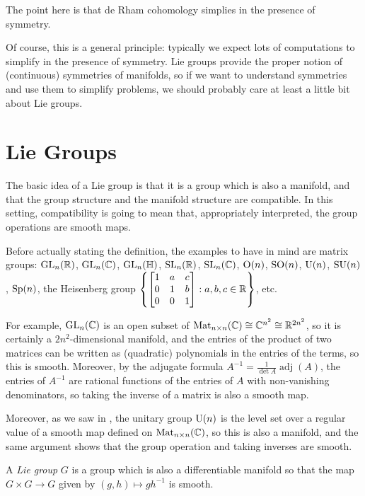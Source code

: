 The point here is that de Rham cohomology simplies in the presence of symmetry. 

Of course, this is a general principle: typically we expect lots of computations to simplify in the presence of symmetry. Lie groups provide the proper notion of (continuous) symmetries of manifolds, so if we want to understand symmetries and use them to simplify problems, we should probably care at least a little bit about Lie groups.

\section{Lie Groups} 
\label{sec:Lie groups}

The basic idea of a Lie group is that it is a group which is also a manifold, and that the group structure and the manifold structure are compatible. In this setting, compatibility is going to mean that, appropriately interpreted, the group operations are smooth maps.

Before actually stating the definition, the examples to have in mind are matrix groups: $\operatorname{GL}_n(\mathbb{R})$, $\operatorname{GL}_n(\mathbb{C})$, $\operatorname{GL}_n(\mathbb{H})$, $\operatorname{SL}_n(\mathbb{R})$, $\operatorname{SL}_n(\mathbb{C})$, $\operatorname{O}(n)$, $\operatorname{SO}(n)$, $\operatorname{U}(n)$, $\operatorname{SU}(n)$, $\operatorname{Sp}(n)$, the Heisenberg group $\left\{\begin{bmatrix} 1 & a & c \\ 0 & 1 & b \\ 0 & 0 & 1 \end{bmatrix} : a,b,c \in \mathbb{R}\right\}$, etc.

For example, $\operatorname{GL}_n(\mathbb{C})$ is an open subset of $\operatorname{Mat}_{n \times n}(\mathbb{C}) \cong \mathbb{C}^{n^2} \cong \mathbb{R}^{2n^2}$, so it is certainly a $2n^2$-dimensional manifold, and the entries of the product of two matrices can be written as (quadratic) polynomials in the entries of the terms, so this is smooth. Moreover, by the adjugate formula $A^{-1} = \frac{1}{\det A} \operatorname{adj}(A)$, the entries of $A^{-1}$ are rational functions of the entries of $A$ with non-vanishing denominators, so taking the inverse of a matrix is also a smooth map. 

Moreover, as we saw in , the unitary group $\operatorname{U}(n)$ is the level set over a regular value of a smooth map defined on $\operatorname{Mat}_{n \times n}(\mathbb{C})$, so this is also a manifold, and the same argument shows that the group operation and taking inverses are smooth.

\begin{definition}\label{def:Lie group}
	A \emph{Lie group} $G$ is a group which is also a differentiable manifold so that the map $G \times G \to G$ given by $(g,h) \mapsto gh^{-1}$ is smooth.
\end{definition}

